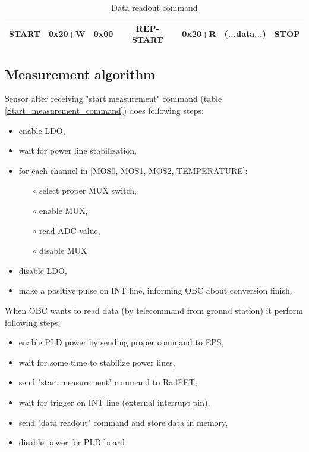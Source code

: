     \begin{table}[H]
        \begin{center}
            \begin{tabular}{|c|c|c|c|c|c|c|}
                \hline
                START & 0x20+W & 0x00 & REP-START & 0x20+R & (...data...) & STOP \\ \hline
            \end{tabular}
        \end{center}
        \caption{Data readout command}
        \label{Data_readout_command}
    \end{table}

    \subsection{Measurement algorithm}
    Sensor after receiving "start measurement" command (table \ref{Start_measurement_command}) does following steps:
    \begin{itemize}
        \item enable LDO,
        \item wait for power line stabilization,
        \item for each channel in [MOS0, MOS1, MOS2, TEMPERATURE]:
        \begin{itemize}
            \item[$\circ$] select proper MUX switch,
            \item[$\circ$] enable MUX,
            \item[$\circ$] read ADC value,
            \item[$\circ$] disable MUX
        \end{itemize}
        \item disable LDO,
        \item make a positive pulse on INT line, informing OBC about conversion finish.
    \end{itemize}

    When OBC wants to read data (by telecommand from ground station) it perform following steps:
    \begin{itemize}
        \item enable PLD power by sending proper command to EPS,
        \item wait for some time to stabilize power lines,
        \item send "start measurement" command to RadFET,
        \item wait for trigger on INT line (external interrupt pin),
        \item send "data readout" command and store data in memory,
        \item disable power for PLD board
    \end{itemize}

